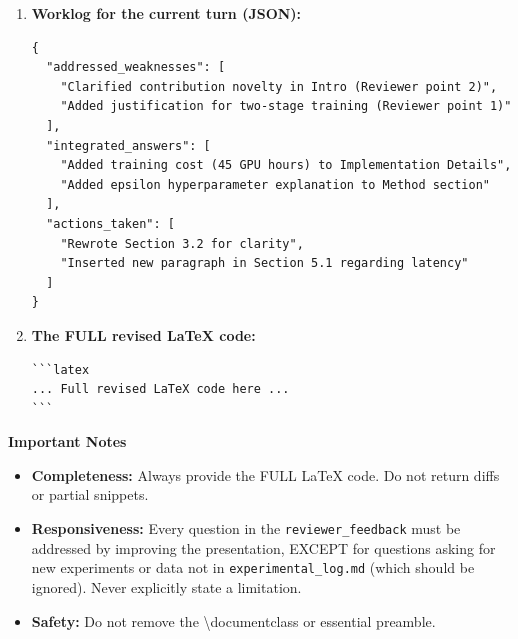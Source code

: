 \begin{enumerate}
    \item \textbf{Worklog for the current turn (JSON):}
\begin{verbatim}
{
  "addressed_weaknesses": [
    "Clarified contribution novelty in Intro (Reviewer point 2)",
    "Added justification for two-stage training (Reviewer point 1)"
  ],
  "integrated_answers": [
    "Added training cost (45 GPU hours) to Implementation Details",
    "Added epsilon hyperparameter explanation to Method section"
  ],
  "actions_taken": [
    "Rewrote Section 3.2 for clarity",
    "Inserted new paragraph in Section 5.1 regarding latency"
  ]
}
\end{verbatim}

    \item \textbf{The FULL revised LaTeX code:}
\begin{verbatim}
```latex
... Full revised LaTeX code here ...
```
\end{verbatim}
\end{enumerate}

\vspace{1em}
\noindent\textbf{Important Notes}
\begin{itemize}
\item \textbf{Completeness:} Always provide the FULL LaTeX code. Do not return diffs or partial snippets.
\item \textbf{Responsiveness:} Every question in the \texttt{reviewer\_feedback} must be addressed by improving the presentation, EXCEPT for questions asking for new experiments or data not in \texttt{experimental\_log.md} (which should be ignored). Never explicitly state a limitation.
\item \textbf{Safety:} Do not remove the \textbackslash{}documentclass or essential preamble.
\end{itemize}
